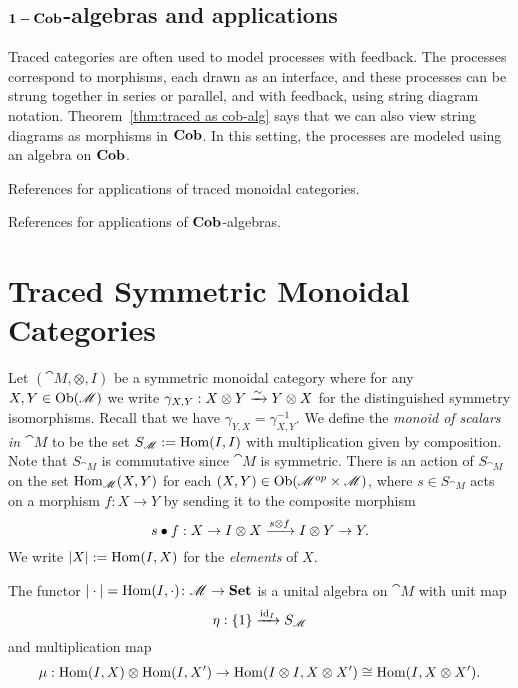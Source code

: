 \section{$\mathbf{1-Cob}$-algebras and applications}

Traced categories are often used to model processes with feedback. The processes correspond to morphisms, each drawn as an interface, and these processes can be strung together in series or parallel, and with feedback, using string diagram notation. Theorem~\ref{thm:traced as cob-alg} says that we can also view string diagrams as morphisms in $\mathbf{Cob}$. In this setting, the processes are modeled using an algebra on $\mathbf{Cob}$.

References for applications of traced monoidal categories.

References for applications of $\mathbf{Cob}$-algebras.

\chapter{Traced Symmetric Monoidal Categories}

Let $(\cat{M},\otimes,I)$ be a symmetric monoidal category where for any $X,Y\in\operatorname{Ob}(\mathscr{M})$ we write $\gamma_{X,Y}:X\otimes Y\xrightarrow{\sim} Y\otimes X$ for the distinguished symmetry isomorphisms. Recall that we have $\gamma_{Y,X}=\gamma_{X,Y}^{-1}$.  We define the {\em monoid of scalars in $\cat{M}$} to be the set $S_{\mathscr{M}}:=\operatorname{Hom}(I,I)$ with multiplication given by composition.  Note that $S_{\cat{M}}$ is commutative since $\cat{M}$ is symmetric.  There is an action of $S_{\cat{M}}$ on the set $\operatorname{Hom}_{\mathscr{M}}(X,Y)$ for each $(X,Y)\in\operatorname{Ob}(\mathscr{M}^{op}\times\mathscr{M})$, where $s\in S_{\cat{M}}$ acts on a morphism $f\colon X\to Y$ by sending it to the composite morphism
$$s\bullet f:X\to I\otimes X\xrightarrow{s\otimes f}I\otimes Y\to Y.$$
We write $|X|:=\operatorname{Hom}(I,X)$ for the \emph{elements} of $X$.

The functor $|\cdot|=\operatorname{Hom}(I,\cdot)\colon\mathscr{M}\to\mathbf{Set}$ is a unital algebra on $\cat{M}$ with unit map
\[\eta:\{1\}\xrightarrow{\operatorname{id}_{I}}S_{\mathscr{M}}\]
and multiplication map
\[\mu:\operatorname{Hom}(I,X)\otimes\operatorname{Hom}(I,X')\to\operatorname{Hom}(I\otimes I,X\otimes X')\cong\operatorname{Hom}(I,X\otimes X').\]

